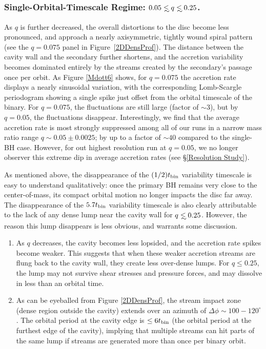 \subsubsection{Single-Orbital-Timescale Regime: $0.05 \lsim q \lsim 0.25$.}
\label{Orbital Timescale Regime}

As $q$ is further decreased, the overall distortions to the disc
become less pronounced, and approach a nearly axisymmetric, tightly
wound spiral pattern (see the $q=0.075$ panel in
Figure~\ref{2DDensProf}).  The distance between the cavity wall and
the secondary further shortens, and the accretion variability becomes
dominated entirely by the streams created by the secondary's passage
once per orbit.  As Figure \ref{Mdott6} shows, for $q=0.075$ the accretion rate displays a nearly sinusoidal
variation, with the corresponding Lomb-Scargle periodogram showing a
single spike just offset from the orbital timescale of the binary.
For $q=0.075$,
the fluctuations are still large (factor of $\sim 3$), but by
$q=0.05$, the fluctuations disappear.  Interestingly,
we find that the average accretion rate is most strongly suppressed
among all of our runs in a narrow mass ratio range $q \sim0.05 \pm 0.0025$; by up to a factor of $\sim 40$ compared
to the single-BH case. However, for out highest resolution run at $q=0.05$, we no longer observer this extreme dip in average accretion rates (see \S \ref{Resolution Study}).

As mentioned above, the disappearance of the $(1/2) t_{\rm bin}$
variability timescale is easy to understand qualitatively: once the
primary BH remains very close to the center-of-mass, its compact
orbital motion no longer impacts the disc far away.  The disappearance
of the $5.7 t_{\rm{bin}}$ variability timescale is also clearly
attributable to the lack of any dense lump near the cavity wall for
$q\lsim 0.25$.  However, the reason this lump disappears is less
obvious, and warrants some discussion.


\begin{enumerate}
\item As $q$ decreases, the cavity becomes less lopsided, and the
  accretion rate spikes become weaker.  This suggests that when these
  weaker accretion streams are flung back to the cavity wall, they
  create less over-dense lumps.  For $q \leq 0.25$, the lump may not
  survive shear stresses and pressure forces, and may dissolve in less
  than an orbital time.
\item As can be eyeballed from Figure \ref{2DDensProf}, the stream
  impact zone (dense region outside the cavity) extends over an
  azimuth of $\Delta\phi \sim 100-120^{\circ}$. The orbital period at
  the cavity edge is $\leq 6 t_{\rm bin}$ (the orbital period at the furthest edge of the cavity), implying that multiple
  streams can hit parts of the same lump if streams are
  generated more than once per binary orbit.
\end{enumerate}


